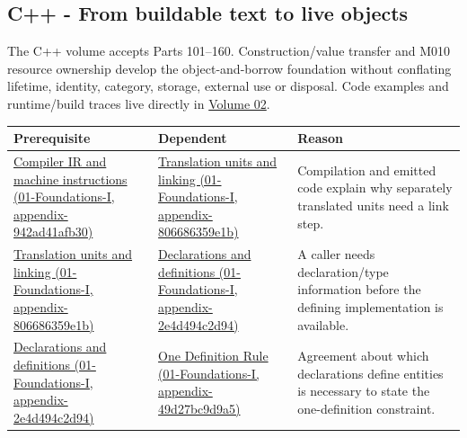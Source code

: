 \subsection{C++ - From buildable text to live objects}\label{appendix-4ad47bdd269a-c---from-buildable-text-to-live-objects}

The C++ volume accepts Parts 101--160. Construction/value transfer and M010 resource ownership develop the object-and-borrow foundation without conflating lifetime, identity, category, storage, external use or disposal. Code examples and runtime/build traces live directly in \href{Continuous\%20Notes/Computing\%20Foundations\%20-\%20From\%20Bits\%20to\%20C++\%20and\%20Systems\%20APIs}{Volume 02}.

{\def\LTcaptype{none} %
\begin{longtable}[]{@{}
  >{\raggedright\arraybackslash}p{}
  >{\raggedright\arraybackslash}p{}
  >{\raggedright\arraybackslash}p{}@{}}
\toprule\noalign{}
\begin{minipage}[b]{\linewidth}\raggedright
Prerequisite
\end{minipage} & \begin{minipage}[b]{\linewidth}\raggedright
Dependent
\end{minipage} & \begin{minipage}[b]{\linewidth}\raggedright
Reason
\end{minipage} \\
\midrule\noalign{}
\endhead
\bottomrule\noalign{}
\endlastfoot
\href{../01-Foundations-I/main.pdf\#nameddest=appendix-942ad41afb30}{Compiler IR and machine instructions (01-Foundations-I, appendix-942ad41afb30)} & \href{../01-Foundations-I/main.pdf\#nameddest=appendix-806686359e1b}{Translation units and linking (01-Foundations-I, appendix-806686359e1b)} & Compilation and emitted code explain why separately translated units need a link step. \\
\href{../01-Foundations-I/main.pdf\#nameddest=appendix-806686359e1b}{Translation units and linking (01-Foundations-I, appendix-806686359e1b)} & \href{../01-Foundations-I/main.pdf\#nameddest=appendix-2e4d494c2d94}{Declarations and definitions (01-Foundations-I, appendix-2e4d494c2d94)} & A caller needs declaration/type information before the defining implementation is available. \\
\href{../01-Foundations-I/main.pdf\#nameddest=appendix-2e4d494c2d94}{Declarations and definitions (01-Foundations-I, appendix-2e4d494c2d94)} & \href{../01-Foundations-I/main.pdf\#nameddest=appendix-49d27bc9d9a5}{One Definition Rule (01-Foundations-I, appendix-49d27bc9d9a5)} & Agreement about which declarations define entities is necessary to state the one-definition constraint. \\

\end{longtable}}
